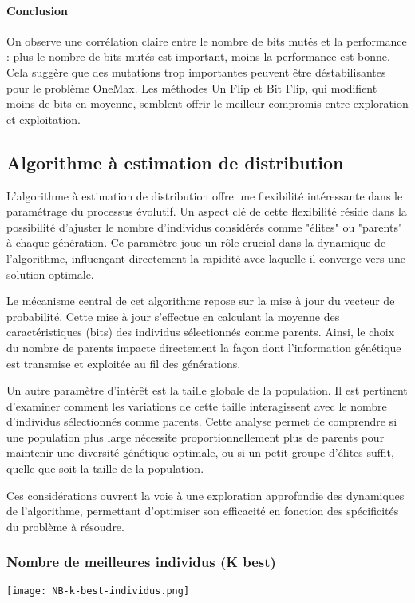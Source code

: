 \documentclass{article}
\begin{document}
\paragraph{Conclusion} On observe une corrélation claire entre le nombre de bits mutés et la performance : plus le nombre de bits mutés est important, moins la performance est bonne. Cela suggère que des mutations trop importantes peuvent être déstabilisantes pour le problème OneMax. Les méthodes Un Flip et Bit Flip, qui modifient moins de bits en moyenne, semblent offrir le meilleur compromis entre exploration et exploitation.

\subsection{Algorithme à estimation de distribution}
L'algorithme à estimation de distribution offre une flexibilité intéressante dans le paramétrage du processus évolutif. Un aspect clé de cette flexibilité réside dans la possibilité d'ajuster le nombre d'individus considérés comme "élites" ou "parents" à chaque génération. Ce paramètre joue un rôle crucial dans la dynamique de l'algorithme, influençant directement la rapidité avec laquelle il converge vers une solution optimale.

Le mécanisme central de cet algorithme repose sur la mise à jour du vecteur de probabilité. Cette mise à jour s'effectue en calculant la moyenne des caractéristiques (bits) des individus sélectionnés comme parents. Ainsi, le choix du nombre de parents impacte directement la façon dont l'information génétique est transmise et exploitée au fil des générations.

Un autre paramètre d'intérêt est la taille globale de la population. Il est pertinent d'examiner comment les variations de cette taille interagissent avec le nombre d'individus sélectionnés comme parents. Cette analyse permet de comprendre si une population plus large nécessite proportionnellement plus de parents pour maintenir une diversité génétique optimale, ou si un petit groupe d'élites suffit, quelle que soit la taille de la population.

Ces considérations ouvrent la voie à une exploration approfondie des dynamiques de l'algorithme, permettant d'optimiser son efficacité en fonction des spécificités du problème à résoudre.

\subsubsection{Nombre de meilleures individus (K best)}
\texttt{[image: NB-k-best-individus.png]}
\end{document}
